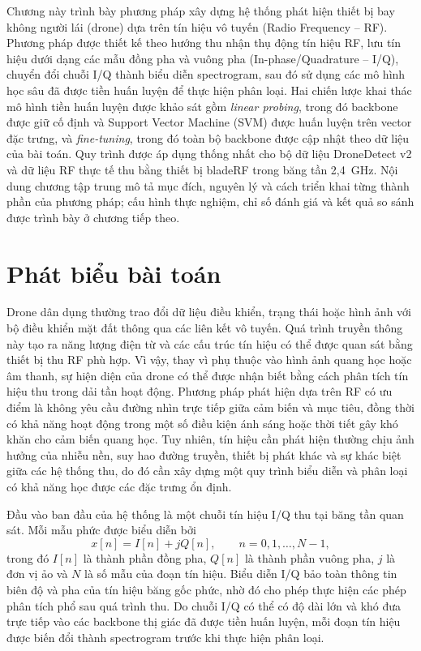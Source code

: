 \documentclass[../DoAn.tex]{subfiles}
\begin{document}
\label{chap:phuong_phap_de_xuat}

Chương này trình bày phương pháp xây dựng hệ thống phát hiện thiết bị bay không người lái (drone) dựa trên tín hiệu vô tuyến (Radio Frequency -- RF). Phương pháp được thiết kế theo hướng thu nhận thụ động tín hiệu RF, lưu tín hiệu dưới dạng các mẫu đồng pha và vuông pha (In-phase/Quadrature -- I/Q), chuyển đổi chuỗi I/Q thành biểu diễn spectrogram, sau đó sử dụng các mô hình học sâu đã được tiền huấn luyện để thực hiện phân loại. Hai chiến lược khai thác mô hình tiền huấn luyện được khảo sát gồm \textit{linear probing}, trong đó backbone được giữ cố định và Support Vector Machine (SVM) được huấn luyện trên vector đặc trưng, và \textit{fine-tuning}, trong đó toàn bộ backbone được cập nhật theo dữ liệu của bài toán. Quy trình được áp dụng thống nhất cho bộ dữ liệu DroneDetect v2 và dữ liệu RF thực tế thu bằng thiết bị bladeRF trong băng tần 2,4~GHz. Nội dung chương tập trung mô tả mục đích, nguyên lý và cách triển khai từng thành phần của phương pháp; cấu hình thực nghiệm, chỉ số đánh giá và kết quả so sánh được trình bày ở chương tiếp theo.

\section{Phát biểu bài toán}

Drone dân dụng thường trao đổi dữ liệu điều khiển, trạng thái hoặc hình ảnh với bộ điều khiển mặt đất thông qua các liên kết vô tuyến. Quá trình truyền thông này tạo ra năng lượng điện từ và các cấu trúc tín hiệu có thể được quan sát bằng thiết bị thu RF phù hợp. Vì vậy, thay vì phụ thuộc vào hình ảnh quang học hoặc âm thanh, sự hiện diện của drone có thể được nhận biết bằng cách phân tích tín hiệu thu trong dải tần hoạt động. Phương pháp phát hiện dựa trên RF có ưu điểm là không yêu cầu đường nhìn trực tiếp giữa cảm biến và mục tiêu, đồng thời có khả năng hoạt động trong một số điều kiện ánh sáng hoặc thời tiết gây khó khăn cho cảm biến quang học. Tuy nhiên, tín hiệu cần phát hiện thường chịu ảnh hưởng của nhiễu nền, suy hao đường truyền, thiết bị phát khác và sự khác biệt giữa các hệ thống thu, do đó cần xây dựng một quy trình biểu diễn và phân loại có khả năng học được các đặc trưng ổn định.

Đầu vào ban đầu của hệ thống là một chuỗi tín hiệu I/Q thu tại băng tần quan sát. Mỗi mẫu phức được biểu diễn bởi
\begin{equation}
    x[n] = I[n] + jQ[n], \qquad n=0,1,\ldots,N-1,
\end{equation}
trong đó $I[n]$ là thành phần đồng pha, $Q[n]$ là thành phần vuông pha, $j$ là đơn vị ảo và $N$ là số mẫu của đoạn tín hiệu. Biểu diễn I/Q bảo toàn thông tin biên độ và pha của tín hiệu băng gốc phức, nhờ đó cho phép thực hiện các phép phân tích phổ sau quá trình thu. Do chuỗi I/Q có thể có độ dài lớn và khó đưa trực tiếp vào các backbone thị giác đã được tiền huấn luyện, mỗi đoạn tín hiệu được biến đổi thành spectrogram trước khi thực hiện phân loại.
\end{document}
